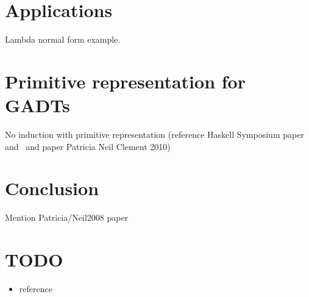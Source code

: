 \documentclass[acmsmall,screen,review,anonymous]{acmart}
\theoremstyle{definition}
\begin{document}
\section{Applications}

Lambda normal form example.



\section{Primitive representation for GADTs}

No induction with primitive representation (reference Haskell Symposium paper and~\cite{jp19} and paper Patricia Neil Clement 2010)



\section{Conclusion}

Mention Patricia/Neil2008 paper



\section{TODO}

\begin{itemize}
\item reference
\end{itemize}


%
%



\end{document}
